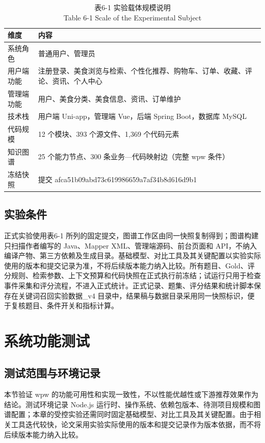 \begin{table}[htbp]
\centering
\small
\caption{表6-1 实验载体规模说明\\Table 6-1 Scale of the Experimental Subject}
\begin{tabularx}{\textwidth}{|X|X|}
\hline
\textbf{维度} & \textbf{内容} \\
\hline
系统角色 & 普通用户、管理员 \\
用户端功能 & 注册登录、美食浏览与检索、个性化推荐、购物车、订单、收藏、评论、资讯、个人中心 \\
管理端功能 & 用户、美食分类、美食信息、资讯、订单维护 \\
技术栈 & 用户端 Uni-app，管理端 Vue，后端 Spring Boot，数据库 MySQL \\
代码规模 & 12 个模块、393 个源文件、1,369 个代码元素 \\
知识图谱 & 25 个能力节点、300 条业务—代码映射边（完整 wpw 条件） \\
冻结快照 & 提交 afca51b09abd73c619986659a7af34b8d616d9b1 \\
\hline
\end{tabularx}
\end{table}


\subsection{实验条件}
正式实验使用表6-1 所列的固定提交，图谱工作区由同一快照复制得到；图谱构建只扫描作者编写的 Java、Mapper XML、管理端源码、前台页面和 API，不纳入编译产物、第三方依赖及生成目录。基础模型、对比工具及其关键配置以实验实际使用的版本和提交记录为准，不将后续版本能力纳入比较。所有题目、Gold、评分规则、检索参数、上下文预算和代码快照在正式执行前冻结；试运行只用于检查事件采集和评分流程，不进入正式统计。正式记录、题集、评分结果和统计脚本保存在关键词召回实验数据\_v4 目录中，结果稿与数据目录采用同一快照标识，便于复核题目、条件开关和指标计算。


\section{系统功能测试}

\subsection{测试范围与环境记录}
本节验证 wpw 的功能可用性和实现一致性，不以性能优越性或下游推荐效果作为结论。测试环境记录 Node.js 运行时、操作系统、依赖包版本、待测项目规模和图谱配置；本章的受控实验还需同时固定基础模型、对比工具及其关键配置。由于相关工具迭代较快，论文采用实验实际使用的版本和提交记录作为版本依据，而不将后续版本能力纳入比较。

